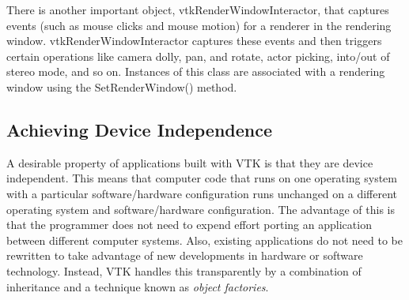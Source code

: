 There is another important object, vtkRenderWindowInteractor, that captures events (such as mouse clicks and mouse motion) for a renderer in the rendering window. vtkRenderWindowInteractor captures these events and then triggers certain operations like camera dolly, pan, and rotate, actor picking, into/out of stereo mode, and so on. Instances of this class are associated with a rendering window using the SetRenderWindow() method.

\subsection{Achieving Device Independence}
\label{sec:adi}

A desirable property of applications built with VTK is that they are device independent. This means that computer code that runs on one operating system with a particular software/hardware configuration runs unchanged on a different operating system and software/hardware configuration. The advantage of this is that the programmer does not need to expend effort porting an application between different computer systems. Also, existing applications do not need to be rewritten to take advantage of new developments in hardware or software technology. Instead, VTK handles this transparently by a combination of inheritance and a technique known as \emph{object factories}.

